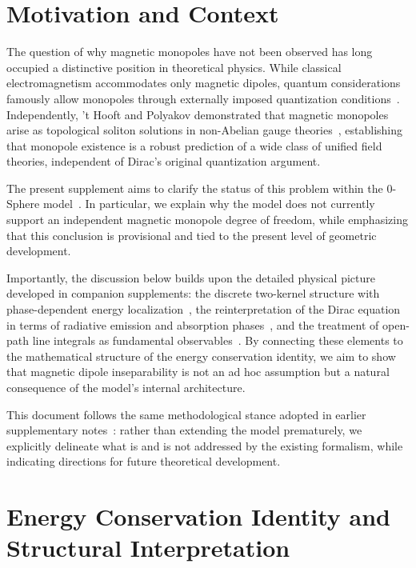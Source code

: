 \documentclass[12pt,letterpaper]{article}
\begin{document}
\section{Motivation and Context}

The question of why magnetic monopoles have not been observed has long occupied a distinctive position in theoretical physics. While classical electromagnetism accommodates only magnetic dipoles, quantum considerations famously allow monopoles through externally imposed quantization conditions~\cite{Dirac1931}. Independently, 't Hooft and Polyakov demonstrated that magnetic monopoles arise as topological soliton solutions in non-Abelian gauge theories~\cite{tHooft1974,Polyakov1974}, establishing that monopole existence is a robust prediction of a wide class of unified field theories, independent of Dirac's original quantization argument.

The present supplement aims to clarify the status of this problem within the 0-Sphere model~\cite{hanamura16759284,hanamura18603340}. In particular, we explain why the model does not currently support an independent magnetic monopole degree of freedom, while emphasizing that this conclusion is provisional and tied to the present level of geometric development.

Importantly, the discussion below builds upon the detailed physical picture developed in companion supplements: the discrete two-kernel structure with phase-dependent energy localization~\cite{hanamura18356895,hanamura18511664}, the reinterpretation of the Dirac equation in terms of radiative emission and absorption phases~\cite{hanamura17760132}, and the treatment of open-path line integrals as fundamental observables~\cite{hanamura18067760,hanamura18135855,hanamura18203433}. By connecting these elements to the mathematical structure of the energy conservation identity, we aim to show that magnetic dipole inseparability is not an ad hoc assumption but a natural consequence of the model's internal architecture.

This document follows the same methodological stance adopted in earlier supplementary notes~\cite{hanamura18603340}: rather than extending the model prematurely, we explicitly delineate what is and is not addressed by the existing formalism, while indicating directions for future theoretical development.

\section{Energy Conservation Identity and Structural Interpretation}
\end{document}
